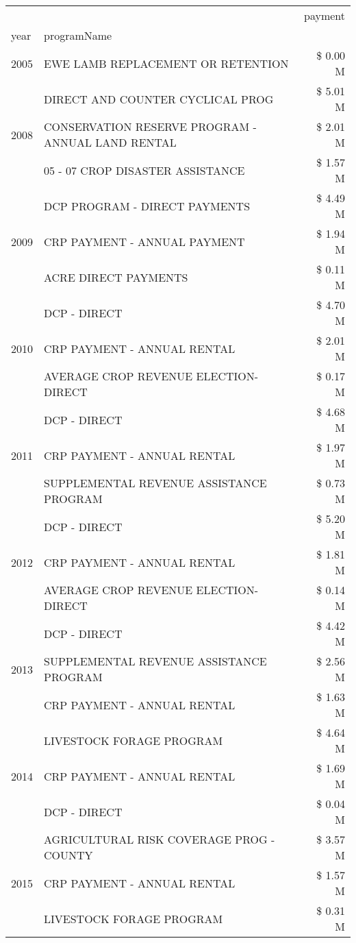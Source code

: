 \begin{tabular}{llr}
\toprule
 &  & payment \\
year & programName &  \\
\midrule
2005 & EWE LAMB REPLACEMENT OR RETENTION & \$ 0.00 M \\
\cline{1-3}
\multirow[t]{3}{*}{2008} & DIRECT AND COUNTER CYCLICAL PROG & \$ 5.01 M \\
 & CONSERVATION RESERVE PROGRAM - ANNUAL LAND RENTAL & \$ 2.01 M \\
 & 05 - 07 CROP DISASTER ASSISTANCE & \$ 1.57 M \\
\cline{1-3}
\multirow[t]{3}{*}{2009} & DCP PROGRAM - DIRECT PAYMENTS & \$ 4.49 M \\
 & CRP PAYMENT - ANNUAL PAYMENT & \$ 1.94 M \\
 & ACRE DIRECT PAYMENTS & \$ 0.11 M \\
\cline{1-3}
\multirow[t]{3}{*}{2010} & DCP - DIRECT & \$ 4.70 M \\
 & CRP PAYMENT - ANNUAL RENTAL & \$ 2.01 M \\
 & AVERAGE CROP REVENUE ELECTION-DIRECT & \$ 0.17 M \\
\cline{1-3}
\multirow[t]{3}{*}{2011} & DCP - DIRECT & \$ 4.68 M \\
 & CRP PAYMENT - ANNUAL RENTAL & \$ 1.97 M \\
 & SUPPLEMENTAL REVENUE ASSISTANCE PROGRAM & \$ 0.73 M \\
\cline{1-3}
\multirow[t]{3}{*}{2012} & DCP - DIRECT & \$ 5.20 M \\
 & CRP PAYMENT - ANNUAL RENTAL & \$ 1.81 M \\
 & AVERAGE CROP REVENUE ELECTION-DIRECT & \$ 0.14 M \\
\cline{1-3}
\multirow[t]{3}{*}{2013} & DCP - DIRECT & \$ 4.42 M \\
 & SUPPLEMENTAL REVENUE ASSISTANCE PROGRAM & \$ 2.56 M \\
 & CRP PAYMENT - ANNUAL RENTAL & \$ 1.63 M \\
\cline{1-3}
\multirow[t]{3}{*}{2014} & LIVESTOCK FORAGE PROGRAM & \$ 4.64 M \\
 & CRP PAYMENT - ANNUAL RENTAL & \$ 1.69 M \\
 & DCP - DIRECT & \$ 0.04 M \\
\cline{1-3}
\multirow[t]{3}{*}{2015} & AGRICULTURAL RISK COVERAGE PROG - COUNTY & \$ 3.57 M \\
 & CRP PAYMENT - ANNUAL RENTAL & \$ 1.57 M \\
 & LIVESTOCK FORAGE PROGRAM & \$ 0.31 M \\

\end{tabular}
